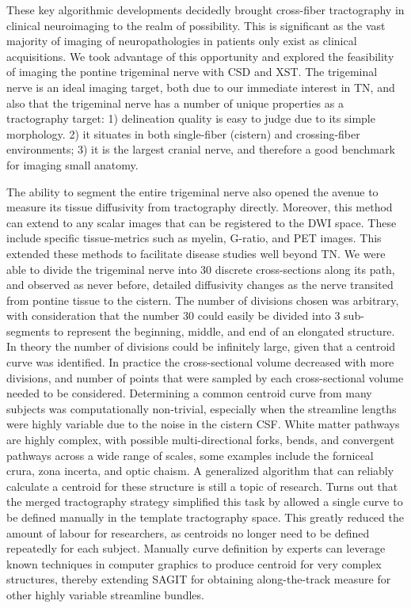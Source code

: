 These key algorithmic developments decidedly brought cross-fiber tractography in clinical neuroimaging to the realm of possibility. This is significant as the vast majority of imaging of neuropathologies in patients only exist as clinical acquisitions. We took advantage of this opportunity and explored the feasibility of imaging the pontine trigeminal nerve with CSD and XST. The trigeminal nerve is an ideal imaging target, both due to our immediate interest in TN, and also that the trigeminal nerve has a number of unique properties as a tractography target: 1) delineation quality is easy to judge due to its simple morphology. 2) it situates in both single-fiber (cistern) and crossing-fiber environments; 3) it is the largest cranial nerve, and therefore a good benchmark for imaging small anatomy.


The ability to segment the entire trigeminal nerve also opened the avenue to measure its tissue diffusivity from tractography directly. Moreover, this method can extend to any scalar images that can be registered to the DWI space. These include specific tissue-metrics such as myelin, G-ratio, and PET images. This extended these methods to facilitate disease studies well beyond TN. We were able to divide the trigeminal nerve into 30 discrete cross-sections along its path, and observed as never before, detailed diffusivity changes as the nerve transited from pontine tissue to the cistern. The number of divisions chosen was arbitrary, with consideration that the number 30 could easily be divided into 3 sub-segments to represent the beginning, middle, and end of an elongated structure. In theory the number of divisions could be infinitely large, given that a centroid curve was identified. In practice the cross-sectional volume decreased with more divisions, and number of points that were sampled by each cross-sectional volume needed to be considered. Determining a common centroid curve from many subjects was computationally non-trivial, especially when the streamline lengths were highly variable due to the noise in the cistern CSF. White matter pathways are highly complex, with possible multi-directional forks, bends, and convergent pathways across a wide range of scales, some examples include the forniceal crura, zona incerta, and optic chaism. A generalized algorithm that can reliably calculate a centroid for these structure is still a topic of research. Turns out that the merged tractography strategy simplified this task by allowed a single curve to be defined manually in the template tractography space. This greatly reduced the amount of labour for researchers, as centroids no longer need to be defined repeatedly for each subject. Manually curve definition by experts can leverage known techniques in computer graphics to produce centroid for very complex structures, thereby extending SAGIT for obtaining along-the-track measure for other highly variable streamline bundles.


